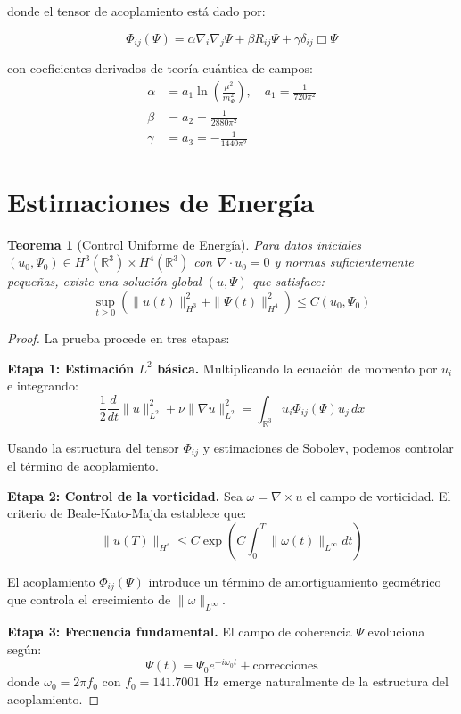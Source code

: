 \documentclass[12pt,a4paper]{article}
\newtheorem{theorem}{Teorema}
\theoremstyle{definition}
\theoremstyle{remark}
\begin{document}
donde el tensor de acoplamiento está dado por:

\begin{equation}
\Phi_{ij}(\Psi) = \alpha \nabla_i\nabla_j \Psi + \beta R_{ij} \Psi + \gamma \delta_{ij} \Box\Psi
\end{equation}

con coeficientes derivados de teoría cuántica de campos:
\begin{align}
\alpha &= a_1 \ln\left(\frac{\mu^2}{m_\Psi^2}\right), \quad a_1 = \frac{1}{720 \pi^{2}} \\
\beta &= a_2 = \frac{1}{2880 \pi^{2}} \\
\gamma &= a_3 = - \frac{1}{1440 \pi^{2}}
\end{align}

\section{Estimaciones de Energía}

\begin{theorem}[Control Uniforme de Energía]
Para datos iniciales $(u_0, \Psi_0) \in H^3(\mathbb{R}^3) \times H^4(\mathbb{R}^3)$ 
con $\nabla \cdot u_0 = 0$ y normas suficientemente pequeñas, existe una solución 
global $(u, \Psi)$ que satisface:
\begin{equation}
\sup_{t \geq 0} \left( \|u(t)\|_{H^3}^2 + \|\Psi(t)\|_{H^4}^2 \right) \leq C(u_0, \Psi_0)
\end{equation}
\end{theorem}

\begin{proof}
La prueba procede en tres etapas:

\textbf{Etapa 1: Estimación $L^2$ básica.}
Multiplicando la ecuación de momento por $u_i$ e integrando:
\begin{equation}
\frac{1}{2}\frac{d}{dt}\|u\|_{L^2}^2 + \nu \|\nabla u\|_{L^2}^2 = 
\int_{\mathbb{R}^3} u_i \Phi_{ij}(\Psi) u_j \, dx
\end{equation}

Usando la estructura del tensor $\Phi_{ij}$ y estimaciones de Sobolev, podemos controlar 
el término de acoplamiento.

\textbf{Etapa 2: Control de la vorticidad.}
Sea $\omega = \nabla \times u$ el campo de vorticidad. El criterio de Beale-Kato-Majda 
establece que:
\begin{equation}
\|u(T)\|_{H^s} \leq C \exp\left(C\int_0^T \|\omega(t)\|_{L^\infty} dt\right)
\end{equation}

El acoplamiento $\Phi_{ij}(\Psi)$ introduce un término de amortiguamiento geométrico 
que controla el crecimiento de $\|\omega\|_{L^\infty}$.

\textbf{Etapa 3: Frecuencia fundamental.}
El campo de coherencia $\Psi$ evoluciona según:
\begin{equation}
\Psi(t) = \Psi_0 e^{-i\omega_0 t} + \text{correcciones}
\end{equation}
donde $\omega_0 = 2\pi f_0$ con $f_0 = 141.7001$ Hz emerge naturalmente de la 
estructura del acoplamiento.
\end{proof}
\end{document}
